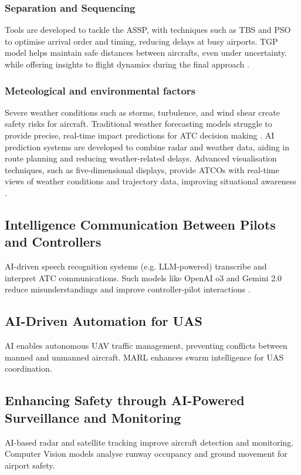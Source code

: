 \subsubsection{Separation and Sequencing}
Tools are developed to tackle the \gls{ASSP}, with techniques such as \gls{TBS} and \gls{PSO} to optimise arrival order and timing, reducing delays at busy airports.
\gls{TGP} model helps maintain safe distances between aircrafts, even under uncertainty. while offering insights to flight dynamics during the final approach \cite{Meier_2024}. 

\subsubsection{Meteological and environmental factors}
Severe weather conditions such as storms, turbulence, and wind shear create safety risks for aircraft. 
Traditional weather forecasting models struggle to provide precise, real-time impact predictions for \gls{ATC} decision making \cite{Ramachandran_2025}.
\gls{AI} prediction systems are developed to combine radar and weather data, aiding in route planning and reducing weather-related delays. 
Advanced visualisation techniques, such as five-dimensional displays, provide \glspl{ATCO} with real-time views of weather conditions and trajectory data, improving situational awareness \cite{Meier_2024}. 


\subsection{Intelligence Communication Between Pilots and Controllers}
\gls{AI}-driven speech recognition systems (e.g. \gls{LLM}-powered) transcribe and interpret \gls{ATC} communications. 
Such models like OpenAI o3 and Gemini 2.0 reduce misunderstandings and improve controller-pilot interactions \cite{Ramachandran_2025}. 


\subsection{AI-Driven Automation for UAS}
\gls{AI} enables autonomous \gls{UAV} traffic management, preventing conflicts between manned and unmanned aircraft.
\gls{MARL} enhances swarm intelligence for \gls{UAS} coordination.


\subsection{Enhancing Safety through AI-Powered Surveillance and Monitoring}
\gls{AI}-based radar and satellite tracking improve aircraft detection and monitoring.
Computer Vision models analyse runway occupancy and ground movement for airport safety.